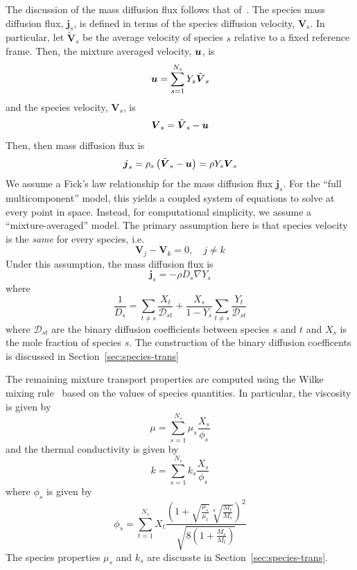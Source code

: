 The discussion of the mass diffusion flux follows that of~\cite{Kee}.
The species mass diffusion flux, $\boldsymbol{j}_s$, is defined in terms
of the species diffusion velocity, $\boldsymbol{V}_s$. In particular,
let $\tilde{\boldsymbol{V}}_s$ be the average velocity of species $s$
relative to a fixed reference frame. Then, the mixture averaged
velocity, $\boldsymbol{u}$, is
%
\begin{equation}
  \boldsymbol{u} = \sum_{s=1}^{N_s} Y_s \tilde{\boldsymbol{V}}_s
\end{equation}
%
and the species velocity, $\boldsymbol{V}_s$, is
%
\begin{equation}
  \boldsymbol{V}_s = \tilde{\boldsymbol{V}}_s - \boldsymbol{u}
\end{equation}
%
Then, then mass diffusion flux is
%
\begin{equation}
  \boldsymbol{j}_s = \rho_s \left( \tilde{\boldsymbol{V}}_s - \boldsymbol{u}
  \right) = \rho Y_s \boldsymbol{V}_s
\end{equation}
%
We assume a Fick's law relationship for the mass diffusion flux
$\boldsymbol{j}_s$. For the ``full multicomponent'' model, this yields
a coupled system of equations to solve at every point in
space. Instead, for computational simplicity, we assume a
``mixture-averaged'' model. The primary assumption here is that
species velocity is the \emph{same} for every species, i.e.
%
\begin{equation}
  \boldsymbol{V}_j - \boldsymbol{V}_k = 0, \quad j \ne k
\end{equation}
%
Under this assumption, the mass diffusion flux is
%
\begin{equation}
  \boldsymbol{j}_s = -\rho D_s \nabla Y_s
\end{equation}
%
where
%
\begin{equation}
  \frac{1}{D_s} = \sum_{t\ne s} \frac{X_t}{\mathcal{D}_{st}} +
  \frac{X_s}{1-Y_s} \sum_{t\ne s} \frac{Y_t}{\mathcal{D}_{st}}
\end{equation}
%
where $\mathcal{D}_{st}$ are the binary diffusion coefficients between
species $s$ and $t$ and $X_s$ is the mole fraction of species $s$. The
construction of the binary diffusion coefficents is discussed in
Section~\ref{sec:species-trans}


The remaining mixture transport properties are computed using the
Wilke mixing rule~\cite{Wilke} based on the values of species
quantities. In particular, the viscosity is given by
%
\begin{equation}
\mu = \sum_{s=1}^{N_s} \mu_s \frac{X_s}{\phi_s}
\end{equation}
%
and the thermal conductivity is given by
%
\begin{equation}
k = \sum_{s=1}^{N_s} k_s \frac{X_s}{\phi_s}
\end{equation}
%
where $\phi_s$ is given by
%
\begin{equation}
\phi_s = \sum_{t=1}^{N_s} X_t \frac{ \left(1 +
  \sqrt{\frac{\mu_s}{\mu_t}}\sqrt[4]{\frac{M_t}{M_s}}\right)^2}{\sqrt{8\left(
1+ \frac{M_s}{M_t}\right)}}
\end{equation}
%
The species properties $\mu_s$ and $k_s$ are discusste in
Section~\ref{sec:species-trans}.


